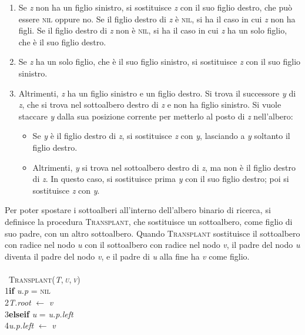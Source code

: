 \documentclass[10pt, a4paper]{report}
\newcommand\firsttab[1][0.5cm]{\hspace*{#1}}
\newcommand\secondtab[1][1cm]{\hspace*{#1}}
\begin{document}
\begin{enumerate}
\item Se \textit{z} non ha un figlio sinistro, si sostituisce \textit{z} con il suo figlio destro, che può essere \textsc{nil} oppure no. Se il figlio destro di \textit{z} è \textsc{nil}, si ha il caso in cui \textit{z} non ha figli. Se il figlio destro di \textit{z} non è \textsc{nil}, si ha il caso in cui \textit{z} ha un solo figlio, che è il suo figlio destro.
\item Se \textit{z} ha un solo figlio, che è il suo figlio sinistro, si sostituisce \textit{z} con il suo figlio sinistro.
\item Altrimenti, \textit{z} ha un figlio sinistro e un figlio destro. Si trova il successore \textit{y} di \textit{z}, che si trova nel sottoalbero destro di \textit{z} e non ha figlio sinistro. Si vuole staccare \textit{y} dalla sua posizione corrente per metterlo al posto di \textit{z} nell'albero:
\begin{itemize}
\item Se \textit{y} è il figlio destro di \textit{z}, si sostituisce \textit{z} con \textit{y}, lasciando a \textit{y} soltanto il figlio destro.
\item Altrimenti, \textit{y} si trova nel sottoalbero destro di \textit{z}, ma non è il figlio destro di \textit{z}. In questo caso, si sostituisce prima \textit{y} con il suo figlio destro; poi si sostituisce \textit{z} con \textit{y}.
\end{itemize}
\end{enumerate}
Per poter spostare i sottoalberi all'interno dell'albero binario di ricerca, si definisce la procedura \textsc{Transplant}, che sostituisce un sottoalbero, come figlio di suo padre, con un altro sottoalbero. Quando \textsc{Transplant} sostituisce il sottoalbero con radice nel nodo \textit{u} con il sottoalbero con radice nel nodo \textit{v}, il padre del nodo \textit{u} diventa il padre del nodo \textit{v}, e il padre di \textit{u} alla fine ha \textit{v} come figlio.\\\\\
\textsc{Transplant(\textit{T},\,\textit{u},\,\textit{v})}\\
1\firsttab\textbf{if} \textit{u.p} = \textsc{nil}\\
2\secondtab\textit{T.root} $\leftarrow$ \textit{v}\\
3\firsttab\textbf{elseif} \textit{u} = \textit{u.p.left}\\
4\secondtab\textit{u.p.left} $\leftarrow$ \textit{v}\\
\end{document}
